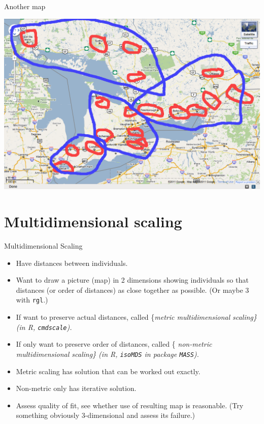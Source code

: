 \documentclass[ignorenonframetext,]{beamer}
\begin{document}
\begin{frame}{Another map}
\protect\hypertarget{another-map}{}

\includegraphics{map2.png}

\section{Multidimensional scaling}

\frame{\sectionpage}

\end{frame}

\begin{frame}[fragile]{Multidimensional Scaling}
\protect\hypertarget{multidimensional-scaling}{}

\begin{itemize}
\item
  Have distances between individuals.
\item
  Want to draw a picture (map) in 2 dimensions showing individuals so
  that distances (or order of distances) as close together as possible.
  (Or maybe 3 with \texttt{rgl}.)
\item
  If want to preserve actual distances, called \{\em metric
  multidimensional scaling\} (in R, \texttt{cmdscale}).
\item
  If only want to preserve order of distances, called \{\em
  non-metric multidimensional scaling\} (in R, \texttt{isoMDS} in
  package \texttt{MASS}).
\item
  Metric scaling has solution that can be worked out exactly.
\item
  Non-metric only has iterative solution.
\item
  Assess quality of fit, see whether use of resulting map is reasonable.
  (Try something obviously 3-dimensional and assess its failure.)
\end{itemize}

\end{frame}
\end{document}
